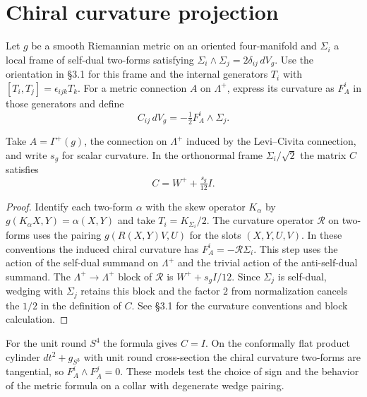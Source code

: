 \section{Chiral curvature projection}

\begin{definition}
\label{def:chiral-wedge-projection}
Let $g$ be a smooth Riemannian metric on an oriented four-manifold and
$\Sigma_i$ a local frame of self-dual two-forms satisfying
$\Sigma_i\wedge\Sigma_j=2\delta_{ij}\,dV_g$.
Use the orientation in \S3.1 for this frame and the internal generators
$T_i$ with $[T_i,T_j]=\epsilon_{ijk}T_k$.
For a metric connection $A$ on $\Lambda^+$, express its curvature as
$F_A^i$ in those generators and define
\[
  C_{ij}\,dV_g=-\tfrac12 F_A^i\wedge\Sigma_j .
\]
\end{definition}

\begin{proposition}
\label{prop:chiral-curvature}
Take $A=\Gamma^+(g)$, the connection on $\Lambda^+$ induced by the
Levi--Civita connection, and write $s_g$ for scalar curvature. In the
orthonormal frame $\Sigma_i/\sqrt{2}$ the matrix $C$ satisfies
\[
  C=W^++\tfrac{s_g}{12}I .
\]
\end{proposition}

\begin{proof}
Identify each two-form $\alpha$ with the skew operator $K_\alpha$ by
$g(K_\alpha X,Y)=\alpha(X,Y)$ and take $T_i=K_{\Sigma_i}/2$.
The curvature operator $\mathcal R$ on two-forms uses the pairing
$g(R(X,Y)V,U)$ for the slots $(X,Y,U,V)$. In these conventions the
induced chiral curvature has $F_A^i=-\mathcal R\Sigma_i$.
This step uses the action of the self-dual summand on $\Lambda^+$ and
the trivial action of the anti-self-dual summand. The
$\Lambda^+\to\Lambda^+$ block of $\mathcal R$ is $W^++s_g I/12$.
Since $\Sigma_j$ is self-dual, wedging with $\Sigma_j$ retains this
block and the factor $2$ from normalization cancels the $1/2$ in the
definition of $C$. See \S3.1 for the curvature conventions and block
calculation.
\end{proof}

For the unit round $S^4$ the formula gives $C=I$. On the conformally
flat product cylinder $dt^2+g_{S^3}$ with unit round cross-section the
chiral curvature two-forms are tangential, so $F_A^i\wedge F_A^j=0$.
These models test the choice of sign and the behavior of the metric
formula on a collar with degenerate wedge pairing.

